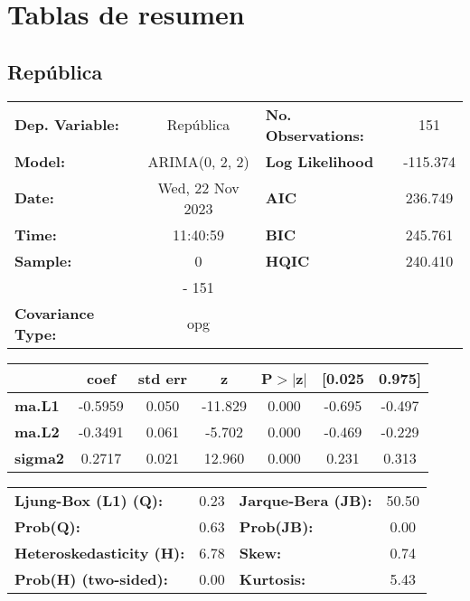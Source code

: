 \documentclass{article}%
\begin{document}
%
\section{Tablas de resumen}%
\label{sec:Tablasderesumen}%
\subsection*{República}%
\begin{center}
\begin{tabular}{lclc}
\toprule
\textbf{Dep. Variable:}          &    República     & \textbf{  No. Observations:  } &    151      \\
\textbf{Model:}                  &  ARIMA(0, 2, 2)  & \textbf{  Log Likelihood     } &  -115.374   \\
\textbf{Date:}                   & Wed, 22 Nov 2023 & \textbf{  AIC                } &  236.749    \\
\textbf{Time:}                   &     11:40:59     & \textbf{  BIC                } &  245.761    \\
\textbf{Sample:}                 &        0         & \textbf{  HQIC               } &  240.410    \\
\textbf{}                        &       - 151      & \textbf{                     } &             \\
\textbf{Covariance Type:}        &       opg        & \textbf{                     } &             \\
\bottomrule
\end{tabular}
\begin{tabular}{lcccccc}
                & \textbf{coef} & \textbf{std err} & \textbf{z} & \textbf{P$> |$z$|$} & \textbf{[0.025} & \textbf{0.975]}  \\
\midrule
\textbf{ma.L1}  &      -0.5959  &        0.050     &   -11.829  &         0.000        &       -0.695    &       -0.497     \\
\textbf{ma.L2}  &      -0.3491  &        0.061     &    -5.702  &         0.000        &       -0.469    &       -0.229     \\
\textbf{sigma2} &       0.2717  &        0.021     &    12.960  &         0.000        &        0.231    &        0.313     \\
\bottomrule
\end{tabular}
\begin{tabular}{lclc}
\textbf{Ljung-Box (L1) (Q):}     & 0.23 & \textbf{  Jarque-Bera (JB):  } & 50.50  \\
\textbf{Prob(Q):}                & 0.63 & \textbf{  Prob(JB):          } &  0.00  \\
\textbf{Heteroskedasticity (H):} & 6.78 & \textbf{  Skew:              } &  0.74  \\
\textbf{Prob(H) (two-sided):}    & 0.00 & \textbf{  Kurtosis:          } &  5.43  \\
\bottomrule
\end{tabular}
\end{center}
\end{document}
